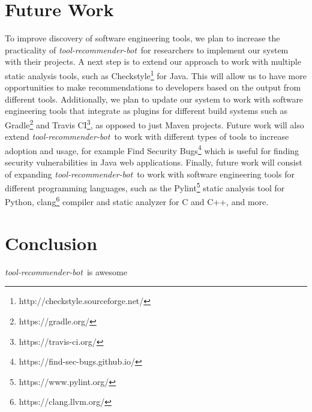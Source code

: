 \documentclass[sigconf,review,anonymous]{acmart}
\newcommand{\tool}{\textsl{tool-recommender-bot}}
\begin{document}
\section{Future Work}

To improve discovery of software engineering tools, we plan to increase the practicality of \tool~for researchers to implement our system with their projects. A next step is to extend our approach to work with multiple static analysis tools, such as Checkstyle\footnote{http://checkstyle.sourceforge.net/} for Java. This will allow us to have more opportunities to make recommendations to developers based on the output from different tools. Additionally, we plan to update our system to work with software engineering tools that integrate as plugins for different build systems such as Gradle\footnote{https://gradle.org/} and Travis CI\footnote{https://travis-ci.org/}, as opposed to just Maven projects. Future work will also extend \tool~to work with different types of tools to increase adoption and usage, for example Find Security Bugs\footnote{https://find-sec-bugs.github.io/} which is useful for finding security vulnerabilities in Java web applications. Finally, future work will consist of expanding \tool~to work with software engineering tools for different programming languages, such as the Pylint\footnote{https://www.pylint.org/} static analysis tool for Python, clang\footnote{https://clang.llvm.org/} compiler and static analyzer for C and C++, and more.



\section{Conclusion}

\tool~is awesome




  
%

\end{document}
